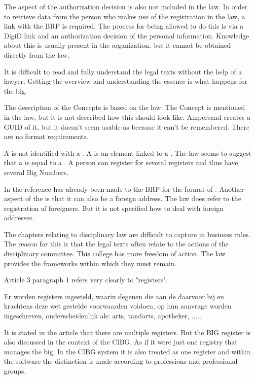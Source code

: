 The aspect of the authorization decision is also not included in the law.
In order to retrieve data from the person who makes use of the registration in the law, a link with the BRP is required.
The process for being allowed to do this is via a DigiD link and an authorization decision of the personal information.
Knowledge about this is usually present in the organization, but it cannot be obtained directly from the law.

It is difficult to read and fully understand the legal texts without the help of a lawyer.
Getting the overview and understanding the essence is what happens for the \acrshort{big}.

The description of the Concepts is based on the law.
The Concept  is mentioned in the law, but it is not described how this should look like.
Ampersand creates a GUID of it, but it doesn't seem usable as  because it can't be remembered.
There are no format requirements.

A  is not identified with a .
A  is an element linked to a .
The law seems to suggest that a  is equal to a .
A person can register for several registers and thus have several Big Numbers.

In the  reference has already been made to the BRP for the format of .
Another aspect of the  is that it can also be a foreign address.
The law does refer to the registration of foreigners.
But it is not specified how to deal with foreign addresses.

The chapters relating to disciplinary law are difficult to capture in business rules.
The reason for this is that the legal texts often relate to the actions of the disciplinary committee.
This college has more freedom of action.
The law provides the frameworks within which they must remain.

Article 3 paragraph 1 refers very clearly to "registers".
\begin{tcolorbox} [title=\acrlong{big} artikel 3 lid 1]
    Er worden registers ingesteld, waarin degenen die aan de daarvoor bij en krachtens deze wet gestelde voorwaarden voldoen, op hun aanvrage worden ingeschreven, onderscheidenlijk als:
    arts,
    tandarts,
    apotheker,
    .....
\end{tcolorbox}
It is stated in the article that there are multiple registers.
But the BIG register is also discussed in the context of the CIBG.
As if it were just one registry that manages the \acrshort{big}.
In the CIBG system it is also treated as one register and within the software the distinction is made according to professions and professional groups.

